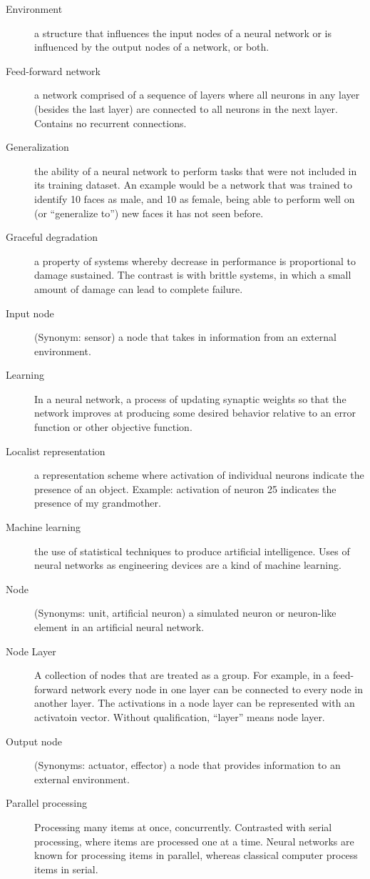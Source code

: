 \begin{description}
\item[Environment] a structure that influences the input nodes of a neural network or is influenced by the output nodes of a network, or both.
\item[Feed-forward network] a network comprised of a sequence of layers where all neurons in any layer (besides the last layer) are connected to all neurons in the next layer. Contains no recurrent connections.
\item[Generalization] the ability of a neural network to perform tasks that were not included in its training dataset. An example would be a network that was trained to identify 10 faces as male, and 10 as female, being able to perform well on (or ``generalize to'') new faces it has not seen before.
\item[Graceful degradation] a property of systems whereby decrease in performance is proportional to damage sustained. The contrast is with brittle systems, in which a small amount of damage can lead to complete failure.
\item[Input node] (Synonym: sensor) a node that takes in information from an external environment. 
\item[Learning] In a neural network, a process of updating synaptic weights so that the network improves at producing some desired behavior relative to an error function or other objective function.
\item[Localist representation] a representation scheme where activation of individual neurons indicate the presence of an object. Example: activation of neuron 25 indicates the presence of my grandmother.
\item[Machine learning] the use of statistical techniques to produce artificial intelligence. Uses of neural networks as engineering devices are a kind of machine learning.
\item[Node] (Synonyms: unit, artificial neuron) a simulated neuron or neuron-like element in an artificial neural network. 
\item[Node Layer] A collection of nodes that are treated as a group. For example, in a feed-forward network every node in one layer can be connected to every node in another layer. The activations in a node layer can be represented with an activatoin vector. Without qualification, ``layer'' means node layer.
\item[Output node] (Synonyms: actuator, effector) a node that provides information to an external environment. 
\item[Parallel processing] Processing many items at once, concurrently. Contrasted with serial processing, where items are processed one at a time.  Neural networks are known for processing items in parallel, whereas classical computer process items in serial.

\end{description}
